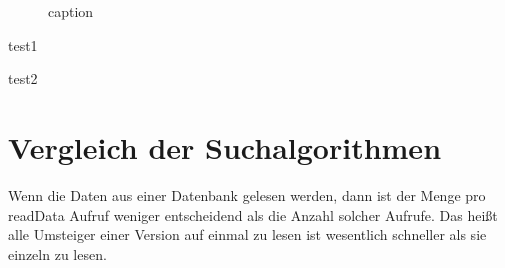 \begin{figure}[H]
    \centering\Large%
    \resizebox{.99\linewidth}{!}{}
    \normalsize\caption{caption}
    \label{vertical-example}
\end{figure}

\begin{minipage}[t]{.5\textwidth}
test1
\end{minipage}
\begin{minipage}[t]{.5\textwidth}
test2
\end{minipage}



\section{Vergleich der Suchalgorithmen}

Wenn die Daten aus einer Datenbank gelesen werden, dann ist der Menge pro readData Aufruf weniger entscheidend als die Anzahl solcher Aufrufe. Das heißt alle Umsteiger einer Version auf einmal zu lesen ist wesentlich schneller als sie einzeln zu lesen. 

